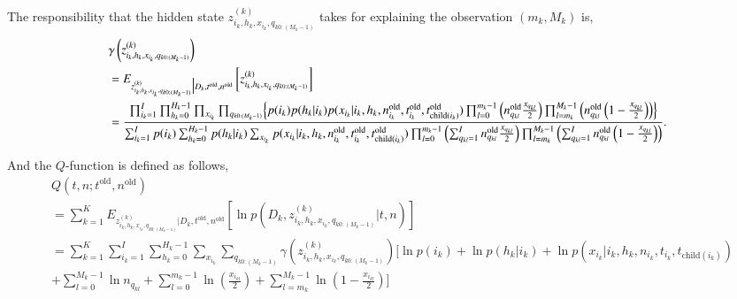 \documentclass{article}
\begin{document}
The responsibility that the hidden state $z^{(k)}_{i_k, h_k, x_{i_k}, q_{k 0:(M_k - 1)}}$ takes for explaining the observation $(m_k, M_k)$ is,
\begin{align}
& \gamma\left(z^{(k)}_{i_k, h_k, x_{i_k}, q_{k 0:(M_k - 1)}}\right)\\
 & = E_{z^{(k)}_{i_k, h_k, x_{i_k}, q_{k 0:(M_k - 1)}} \big| D_k, t^{\mathrm{old}}, n^{\mathrm{old}}} \left[z^{(k)}_{i_k, h_k, x_{i_k}, q_{k 0:(M_k - 1)}}\right]\\
 & = \frac{\prod_{i_k=1}^{I} \prod_{h_k=0}^{H_k - 1} \prod_{x_{i_k}} \prod_{q_{k 0:(M_k - 1)}} \Bigl\{p(i_k) p(h_k | i_k) p(x_{i_k} | i_k, h_k, n_{i_k}^{\mathrm{old}}, t_{i_k}^{\mathrm{old}}, t_{\mathrm{child}(i_k)}^{\mathrm{old}}) \prod_{l=0}^{m_k - 1} \left( n_{q_{kl}}^{\mathrm{old}} \frac{x_{q_{kl}}}{2} \right) \prod_{l=m_k}^{M_k - 1} \left( n_{q_{kl}}^{\mathrm{old}} \left(1-\frac{x_{q_{kl}}}{2} \right) \right) \Bigr\}}
 {\sum_{i_k=1}^{I} p(i_k) \sum_{h_k=0}^{H_k - 1} p(h_k | i_k) \sum_{x_{i_k}} p(x_{i_k} | i_k, h_k, n_{i_k}^{\mathrm{old}}, t_{i_k}^{\mathrm{old}}, t_{\mathrm{child}(i_k)}^{\mathrm{old}}) \prod_{l=0}^{m_k - 1} \left( \sum_{q_{kl}=1}^{I} n_{q_{kl}}^{\mathrm{old}} \frac{x_{q_{kl}}}{2} \right) \prod_{l=m_k}^{M_k - 1} \left( \sum_{q_{kl}=1}^{I} n_{q_{kl}}^{\mathrm{old}} \left(1-\frac{x_{q_{kl}}}{2} \right) \right)}.
\end{align}

And the $Q$-function is defined as follows,
\begin{align}
 & Q(t,n;t^{\mathrm{old}},n^{\mathrm{old}})\nonumber\\
 & = \sum_{k=1}^{K} E_{z^{(k)}_{i_k, h_k, x_{i_k}, q_{k 0:(M_k - 1)}} \big| D_k, t^{\mathrm{old}}, n^{\mathrm{old}}}
 \left[ \ln p\left(D_k, z^{(k)}_{i_k, h_k, x_{i_k}, q_{k 0:(M_k - 1)}} \big| t,n\right) \right]\nonumber\\
 & = \sum_{k=1}^{K}\sum_{i_k=1}^{I}\sum_{h_k=0}^{H_k - 1}\sum_{x_{i_k}} \sum_{q_{k0:(M_k-1)}} \gamma(z^{(k)}_{i_k, h_k, x_{i_k}, q_{k 0:(M_k - 1)}})\Biggl[\ln p(i_k) + \ln p(h_k | i_k) + \ln p(x_{i_k} | i_k, h_k, n_{i_k}, t_{i_k}, t_{\mathrm{child}(i_k)})\nonumber\\
 & + \sum_{l=0}^{M_k - 1} \ln n_{q_{kl}} + \sum_{l=0}^{m_k - 1} \ln \left(\frac{x_{i_{kl}}}{2}\right) + \sum_{l=m_k}^{M_k -1} \ln \left(1 - \frac{x_{i_{kl}}}{2}\right) \Biggr]
\end{align}
\end{document}
